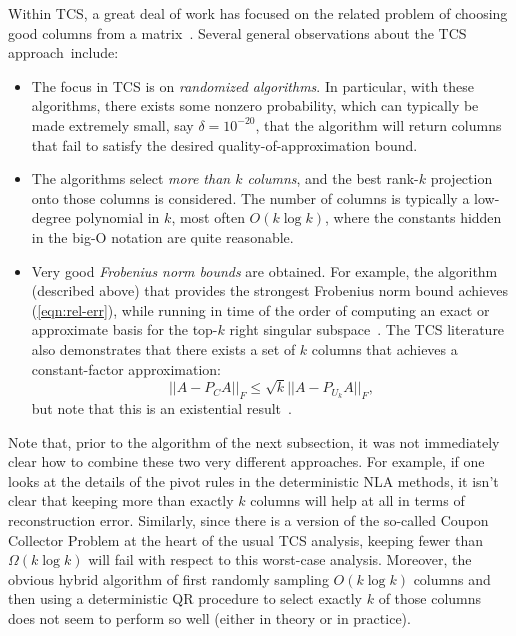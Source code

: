 \documentclass[twoside]{article}
\begin{document}
Within TCS, a great deal of work has focused on the related problem of 
choosing good columns from a 
matrix~\cite{DFKVV04_JRNL,dkm_matrix1,dkm_matrix2,dkm_matrix3,RV07,DMM08_CURtheory_JRNL}.
Several general observations about the TCS approach~include:
\begin{itemize}
\item
The focus in TCS is on \emph{randomized 
algorithms}.
In particular, with these algorithms, there exists some nonzero 
probability, which can typically be made extremely small, say 
$\delta=10^{-20}$, that the algorithm will return columns that fail to 
satisfy the desired quality-of-approximation bound. 
\item
The algorithms select \emph{more than $k$ columns}, and the best 
rank-$k$ projection onto those columns is considered.
The number of columns is typically a low-degree polynomial in $k$, most often
$O(k \log k)$, where the constants hidden in the big-O notation are quite 
reasonable.
\item
Very good \emph{Frobenius norm bounds} are obtained. 
For example, the algorithm (described above) that provides the strongest 
Frobenius norm bound achieves
(\ref{eqn:rel-err}),
while running in time of the order of computing an exact or approximate 
basis for the top-$k$ right singular subspace~\cite{DMM08_CURtheory_JRNL}.
The TCS literature also demonstrates that there exists a set of $k$ columns 
that achieves a constant-factor approximation:
\begin{equation}
||A-P_{C}A||_F \le \sqrt{k} ||A-P_{U_k}A ||_F  ,
\label{eqn:cssp-3}
\end{equation}
but note that this is an existential result~\cite{DV06}.
\end{itemize}

Note that, prior to the algorithm of the next subsection, it was not 
immediately clear how to combine these two very different approaches.
For example, if one looks at the details of the pivot rules in the 
deterministic NLA methods, it isn't clear that keeping more than exactly 
$k$ columns will help at all in terms of reconstruction error.
Similarly, since there is a version of the so-called Coupon Collector 
Problem at the heart of the usual TCS analysis, keeping fewer than 
$\Omega(k \log k)$ will fail with respect to this worst-case analysis.
Moreover, the obvious hybrid algorithm of first randomly sampling 
$O(k \log k)$ columns and then using a deterministic QR procedure to select 
exactly $k$ of those columns does not seem to perform so well (either in 
theory or in practice).
\end{document}
